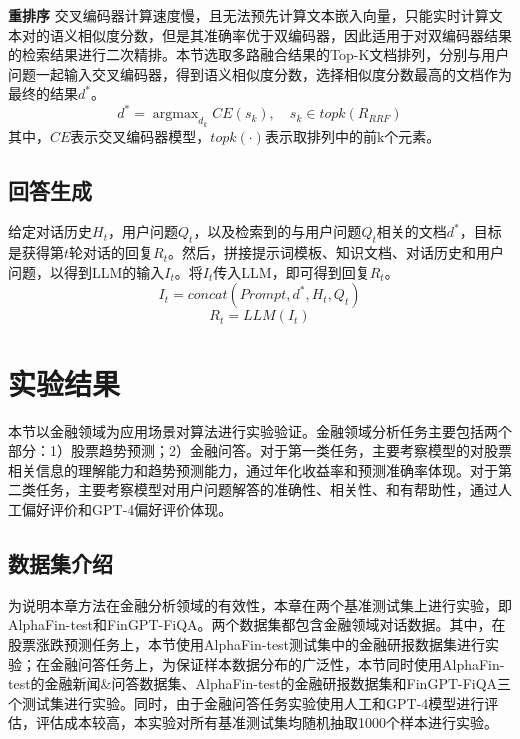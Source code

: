 \textbf{重排序} 交叉编码器计算速度慢，且无法预先计算文本嵌入向量，只能实时计算文本对的语义相似度分数，但是其准确率优于双编码器，因此适用于对双编码器结果的检索结果进行二次精排。本节选取多路融合结果的Top-K文档排列，分别与用户问题一起输入交叉编码器，得到语义相似度分数，选择相似度分数最高的文档作为最终的结果$d^*$。
\begin{equation}
	d^* = \mathop{\arg\max}_{d_k}CE(s_k), \quad s_k \in topk(R_{RRF})
\end{equation}
其中，$CE$表示交叉编码器模型，$topk(\cdot)$表示取排列中的前k个元素。

\subsection{回答生成}

给定对话历史$H_t$，用户问题$Q_t$，以及检索到的与用户问题$Q_t$相关的文档$d^*$，目标是获得第$t$轮对话的回复$R_t$。然后，拼接提示词模板、知识文档、对话历史和用户问题，以得到LLM的输入$I_t$。将$I_t$传入LLM，即可得到回复$R_t$。
\begin{equation}
	I_t = concat(Prompt, d^*, H_t, Q_t)
\end{equation}
\begin{equation}
	R_t = LLM(I_t)
\end{equation}

\section{实验结果}

本节以金融领域为应用场景对算法进行实验验证。金融领域分析任务主要包括两个部分：1）股票趋势预测；2）金融问答。对于第一类任务，主要考察模型的对股票相关信息的理解能力和趋势预测能力，通过年化收益率和预测准确率体现。对于第二类任务，主要考察模型对用户问题解答的准确性、相关性、和有帮助性，通过人工偏好评价和GPT-4偏好评价体现。

\subsection{数据集介绍}

为说明本章方法在金融分析领域的有效性，本章在两个基准测试集上进行实验，即AlphaFin-test和FinGPT-FiQA\cite{wang2023fingptbenchmark}。两个数据集都包含金融领域对话数据。其中，在股票涨跌预测任务上，本节使用AlphaFin-test测试集中的金融研报数据集进行实验；在金融问答任务上，为保证样本数据分布的广泛性，本节同时使用AlphaFin-test的金融新闻\&问答数据集、AlphaFin-test的金融研报数据集和FinGPT-FiQA三个测试集进行实验。同时，由于金融问答任务实验使用人工和GPT-4模型进行评估，评估成本较高，本实验对所有基准测试集均随机抽取1000个样本进行实验。

